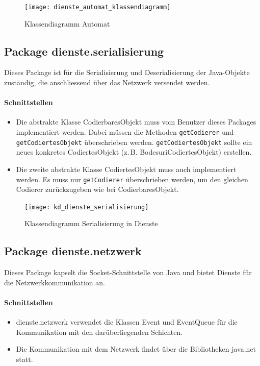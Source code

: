 \documentclass[12pt,halfparskip]{scrartcl}
\begin{document}
\begin{figure}[H]
	\centering
	\texttt{[image: dienste\_automat\_klassendiagramm]}
	\caption{Klassendiagramm Automat}
	\label{fig:dienste_automat_klassendiagramm}
\end{figure}

\clearpage
\subsection{Package dienste.serialisierung}

Dieses Package ist für die Serialisierung und Deserialisierung der Java-Objekte zuständig, die anschliessend über das Netzwerk versendet werden.

\paragraph{Schnittstellen}
\begin{itemize}
	\item Die abstrakte Klasse CodierbaresObjekt muss vom Benutzer dieses Packages implementiert werden. Dabei müssen die Methoden \texttt{getCodierer} und \texttt{getCodiertesObjekt} überschrieben werden. \texttt{getCodiertesObjekt} sollte ein neues konkretes CodiertesObjekt (z.\,B. BodesuriCodiertesObjekt) erstellen.
	\item Die zweite abstrakte Klasse CodiertesObjekt muss auch implementiert werden. Es muss nur \texttt{getCodierer} überschrieben werden, um den gleichen Codierer zurückzugeben wie bei CodierbaresObjekt.
\end{itemize}

\begin{figure}[H]
	\centering
	\texttt{[image: kd\_dienste\_serialisierung]}
	\caption{Klassendiagramm Serialisierung in Dienste}
	\label{fig:kd_dienste_serialisierung}
\end{figure}

\clearpage
\subsection{Package dienste.netzwerk}

Dieses Package kapselt die Socket-Schnittstelle von Java und bietet Dienste für die Netzwerkkommunikation an.

\paragraph{Schnittstellen}
\begin{itemize}
	\item dienste.netzwerk verwendet die Klassen Event und EventQueue für die Kommunikation mit den darüberliegenden Schichten.
	\item Die Kommunikation mit dem Netzwerk findet über die Bibliotheken java.net statt.
\end{itemize}
\end{document}
